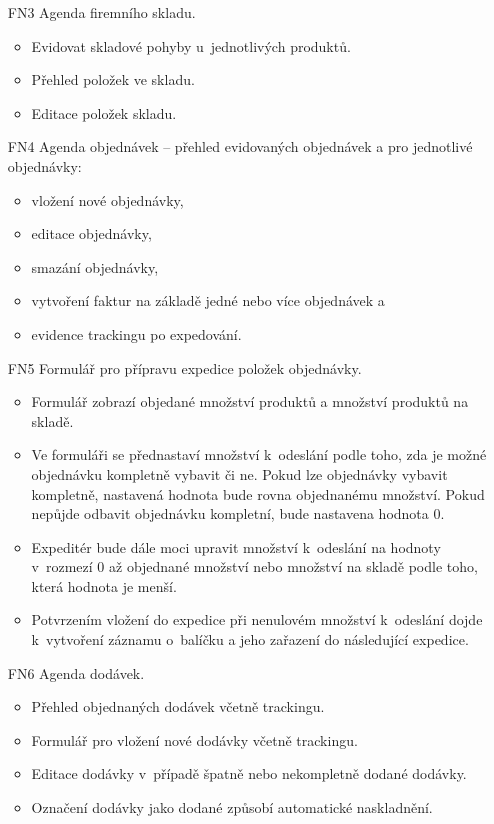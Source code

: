 \documentclass[thesis=B,czech]{FITthesis}[2012/06/26]
\begin{document}
\begin{enumerate}
	\newpage
	\item[FN3] Agenda firemního skladu.
		\begin{itemize}
			\item Evidovat skladové pohyby u~jednotlivých produktů.
			\item Přehled položek ve skladu.
			\item Editace položek skladu.
		\end{itemize}
	\item[FN4] Agenda objednávek -- přehled evidovaných objednávek a pro jednotlivé objednávky:
	\begin{itemize}
		\item vložení nové objednávky,
		\item editace objednávky,
		\item smazání objednávky,
		\item vytvoření faktur na základě jedné nebo více objednávek a
		\item evidence trackingu po expedování.
	\end{itemize}
	\item[FN5] Formulář pro přípravu expedice položek objednávky.
	\begin{itemize}
		\item Formulář zobrazí objedané množství produktů a množství produktů na skladě. 
		\item Ve formuláři se přednastaví množství k~odeslání podle toho, zda je možné objednávku kompletně vybavit či ne. Pokud lze objednávky vybavit kompletně, nastavená hodnota bude rovna objednanému množství. Pokud nepůjde odbavit objednávku kompletní, bude nastavena hodnota 0.
		\item Expeditér bude dále moci upravit množství k~odeslání na hodnoty v~rozmezí 0 až objednané množství nebo množství na skladě podle toho, která hodnota je menší.
		\item Potvrzením vložení do expedice při nenulovém množství k~odeslání dojde k~vytvoření záznamu o~balíčku a jeho zařazení do následující expedice.
	\end{itemize}
	\item[FN6] Agenda dodávek.
	\begin{itemize}
		\item Přehled objednaných dodávek včetně trackingu.
		\item Formulář pro vložení nové dodávky včetně trackingu.
		\item Editace dodávky v~případě špatně nebo nekompletně dodané dodávky.
		\item Označení dodávky jako dodané způsobí automatické naskladnění.

\end{itemize}
\end{enumerate}
\end{document}
